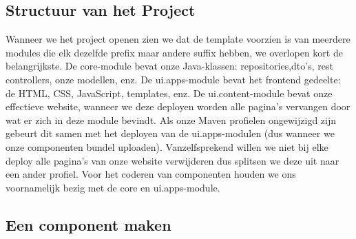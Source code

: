 \documentclass{article}
\begin{document}
	\subsection{Structuur van het Project}
	Wanneer we het project openen zien we dat de template voorzien is van meerdere modules die elk dezelfde prefix maar andere suffix hebben, we overlopen kort de belangrijkste. De core-module bevat onze Java-klassen: repositories,dto's, rest controllers, onze modellen, enz. De ui.apps-module bevat het frontend gedeelte: de HTML, CSS, JavaScript, templates, enz. De ui.content-module bevat onze effectieve website, wanneer we deze deployen worden alle pagina's vervangen door wat er zich in deze module bevindt. Als onze Maven profielen ongewijzigd zijn gebeurt dit samen met het deployen van de ui.apps-modulen (dus wanneer we onze componenten bundel uploaden). Vanzelfsprekend willen we niet bij elke deploy alle pagina's van onze website verwijderen dus splitsen we deze uit naar een ander profiel. Voor het coderen van componenten houden we ons voornamelijk bezig met de core en ui.apps-module.
	\subsection{Een component maken}
	
\end{document}
